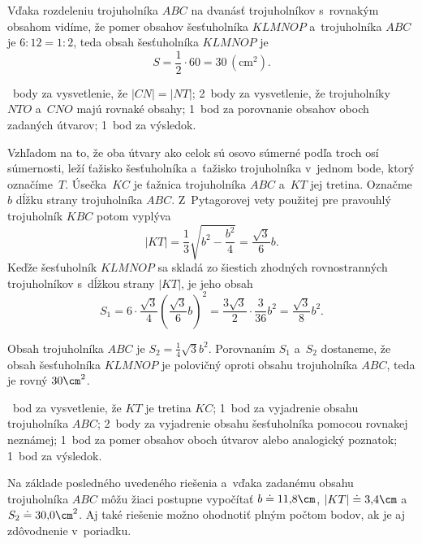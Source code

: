 {Vďaka rozdeleniu trojuholníka $ABC$ na dvanásť trojuholníkov s~rovnakým obsahom
vidíme, že pomer obsahov šesťuholníka $KLMNOP$ a~trojuholníka $ABC$ je
$6:12 = 1:2$,
teda obsah šesťuholníka $KLMNOP$ je
$$
S= \frac12\cdot 60 = 30\,(\text{cm}^2).
$$

~body za vysvetlenie, že  $|CN|=|NT|$;
2~body za vysvetlenie, že trojuholníky $NTO$ a~$CNO$ majú rovnaké obsahy;
1~bod za porovnanie obsahov oboch zadaných útvarov;
1~bod za výsledok.
\endhodnotenie

\ineriesenie
Vzhľadom na to, že oba útvary ako celok sú osovo súmerné podľa troch osí
súmernosti, leží ťažisko šesťuholníka a~ťažisko trojuholníka v~jednom
bode, ktorý označíme~$T$.
Úsečka~$KC$ je ťažnica trojuholníka $ABC$ a~$KT$ jej tretina.
Označme $b$ dĺžku strany trojuholníka $ABC$.
Z~Pytagorovej vety použitej pre pravouhlý trojuholník $KBC$ potom vyplýva
$$
|KT|=\frac13\sqrt{b^2-\frac{b^2}4}
=\frac{\sqrt3}6 b.
$$
Keďže šesťuholník $KLMNOP$ sa skladá zo šiestich zhodných rovnostranných
trojuholníkov s~dĺžkou strany $|KT|$, je jeho obsah
$$
S_1=6\cdot\frac{\sqrt3}4\left(\frac{\sqrt3}6b\right)^{\!\!2}
=\frac{3\sqrt3}2\cdot\frac3{36}b^2
=\frac{\sqrt3}8 b^2.
$$

Obsah trojuholníka $ABC$ je
$S_2=\frac1{4}{\sqrt3}b^2$.
Porovnaním $S_1$ a~$S_2$ dostaneme, že obsah šesťuholníka $KLMNOP$ je
polovičný oproti obsahu trojuholníka $ABC$, teda je rovný $30\cm^2$.

~bod za vysvetlenie, že $KT$ je tretina $KC$;
1~bod za vyjadrenie obsahu trojuholníka $ABC$;
2~body za vyjadrenie obsahu šesťuholníka pomocou rovnakej neznámej;
1~bod za pomer obsahov oboch útvarov alebo analogický poznatok;
1~bod za výsledok.
\endhodnotenie

\poznamka
Na základe posledného uvedeného riešenia a~vďaka zadanému obsahu trojuholníka
$ABC$ môžu žiaci postupne vypočítať $b\doteq 11{,}8\cm$, $|KT|\doteq
3{,}4\cm$ a~$S_2\doteq 30{,}0\cm^2$.
Aj také riešenie možno ohodnotiť plným počtom bodov, ak je aj zdôvodnenie
v~poriadku.
}

